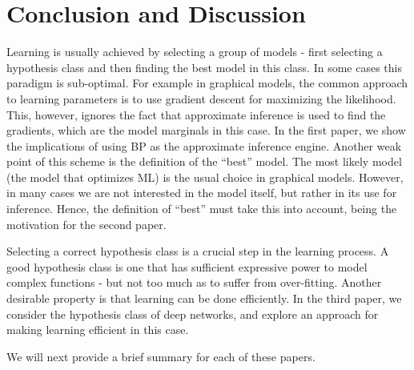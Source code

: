 \chapter{Conclusion and Discussion } %
\label{con} %
  Learning is usually achieved by selecting a group of models - first selecting a hypothesis class and then finding the best model in this class.
  In some cases this paradigm is sub-optimal.
  For example in graphical models, the common approach to learning parameters is to use gradient descent for maximizing the likelihood.
  This, however, ignores the fact that approximate inference is used to find the gradients, which are the model marginals in this case.
  In the first paper, we show the implications of using BP as the approximate inference engine. Another weak point of this scheme is the definition of the ``best'' model. The most likely model (the model that optimizes ML) is the usual choice in graphical models. However, in many cases we are not interested in the model itself, but rather in its use for inference. Hence, the definition of ``best'' must take this into account, being the motivation for the second paper.

Selecting a correct hypothesis class is a crucial step in the learning
process.  A good hypothesis class is one that has sufficient expressive
power to model complex functions - but not too much as to suffer from
over-fitting. Another desirable property is that learning can be done efficiently.  In the third paper, we consider the hypothesis class of deep networks, and explore an approach for making learning efficient in this case.

We will next provide a brief summary for each of these papers.

